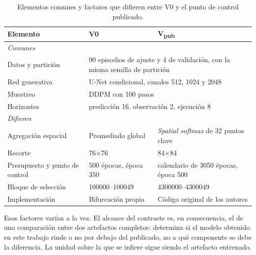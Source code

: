 \begin{table}[htbp]
  \centering
  \caption{Elementos comunes y factores que difieren entre V0 y el punto de control
    publicado.}
  \label{tab:comparacion-factores}
  \small
  \scriptsize
  \begin{tabular}{p{30mm} p{40mm} p{40mm}}
    \toprule
    Elemento & V0 & V\textsubscript{pub} \\
    \midrule
    \multicolumn{3}{l}{\textit{Comunes}} \\
    Datos y partici\'on & \multicolumn{2}{p{82mm}}{\num{90} episodios de ajuste y \num{4} de
      validaci\'on, con la misma semilla de partici\'on} \\
    Red generativa & \multicolumn{2}{p{82mm}}{U-Net condicional, canales \num{512},
      \num{1024} y \num{2048}} \\
    Muestreo & \multicolumn{2}{p{82mm}}{DDPM con \num{100} pasos} \\
    Horizontes & \multicolumn{2}{p{82mm}}{predicci\'on \num{16}, observaci\'on \num{2},
      ejecuci\'on \num{8}} \\
    \midrule
    \multicolumn{3}{l}{\textit{Difieren}} \\
    Agregaci\'on espacial & Promediado global & \textit{Spatial softmax} de \num{32} puntos
      clave \\
    Recorte & \num{76}$\times$\num{76} & \num{84}$\times$\num{84} \\
    Presupuesto y punto de control & \num{500} \'epocas, \'epoca \num{350} & calendario de
      \num{3050} \'epocas, \'epoca \num{500} \\
    Bloque de selecci\'on & \numrange{100000}{100049} & \numrange{4300000}{4300049} \\
    Implementaci\'on & Bifurcaci\'on propia & C\'odigo original de los autores \\
    \bottomrule
  \end{tabular}
\end{table}

Esos factores var\'ian a la vez. El alcance del contraste es, en consecuencia, el de una
comparaci\'on entre dos artefactos completos: determina si el modelo obtenido en este
trabajo rinde o no por debajo del publicado, no a qu\'e componente se debe la diferencia. La
unidad sobre la que se infiere sigue siendo el artefacto entrenado.

